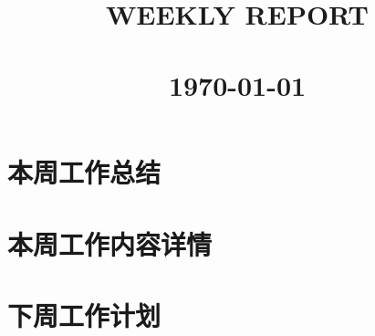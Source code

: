 \documentclass{ctexart}
\title{
        \normalsize \textsc{}
        \\[2.0cm]
        \HRule{0.5pt}\\
        \LARGE \textbf{\uppercase{Weekly Report}}\\
        \HRule{2pt} \\[0.5cm]
        \normalsize \today \vspace*{5\baselineskip}
}
\date{}
\author{
}
\begin{document}
\maketitle
\newpage
\tableofcontents
\newpage

\section{本周工作总结}


\section{本周工作内容详情}


\section{下周工作计划}

\end{document}

